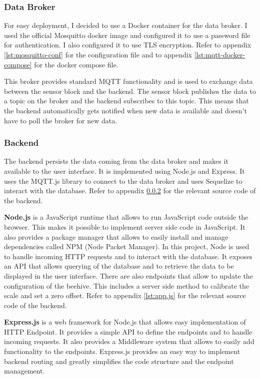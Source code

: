 \subsubsection {Data Broker} \label{sec:data_broker}
For easy deployment, I decided to use a \Gls{Docker} container for the data broker. I used the official Mosquitto docker image and configured it to use a password file for authentication. I also configured it to use \Gls{TLS} encryption. Refer to appendix \ref{lst:mosquitto-conf} for the configuration file and to appendix \ref{lst:mqtt-docker-compose} for the docker compose file.

This broker provides standard MQTT functionality and is used to exchange data between the sensor block and the backend. The sensor block publishes the data to a topic on the broker and the backend subscribes to this topic. This means that the backend automatically gets notified when new data is available and doesn't have to poll the broker for new data.

\subsubsection {Backend} \label{sec:backend}
The backend persists the data coming from the data broker and makes it available to the user interface. It is implemented using Node.js and Express. It uses the MQTT.js library to connect to the data broker and uses Sequelize to interact with the database. Refer to appendix \ref{sec:backend} for the relevant source code of the backend.

\textbf{Node.js} is a JavaScript runtime that allows to run JavaScript code outside the browser. This makes it possible to implement server side code in JavaScript. It also provides a package manager that allows to easily install and manage dependencies called NPM (Node Packet Manager). In this project, Node is used to handle incoming HTTP requests and to interact with the database. 
It exposes an API that allows querying of the database and to retrieve the data to be displayed in the user interface. There are also endpoints that allow to update the configuration of the beehive. This includes a server side method to calibrate the scale and set a zero offset. Refer to appendix \ref{lst:app.js} for the relevant source code of the backend.

\textbf{Express.js} is a web framework for Node.js that allows  easy implementation of \Gls{HTTP} \gls{Endpoint}. It provides a simple \Gls{API} to define the endpoints and to handle incoming requests. It also provides a \Gls{Middleware} system that allows to easily add functionality to the endpoints. Express.js provides an easy way to implement backend routing and greatly simplifies the code structure and the endpoint management.

